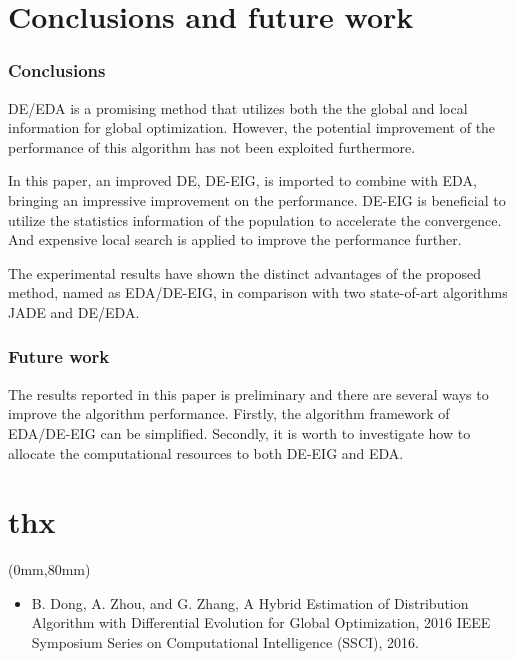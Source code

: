 \documentclass[xcolor=dvipsnames]{beamer}
\newenvironment{reference}[2]{%
  \begin{textblock*}{\textwidth}(#1,#2)
     \bgroup\fontsize{6pt}{\baselineskip}\selectfont\color[RGB]{0,112,192}}{\egroup\end{textblock*}}
\begin{document}
    \section{Conclusions and future work}
    \begin{frame}
    \frametitle{Conclusions}
    DE/EDA is a promising method that utilizes both the the global and local information for global optimization. However, the potential improvement of the performance of this algorithm has not been exploited furthermore.
    \par
     In this paper, an improved DE, DE-EIG, is imported to combine with EDA, bringing an impressive improvement on the performance. DE-EIG is beneficial to utilize the statistics information of the population to accelerate the convergence. And expensive local search is applied to improve the performance further. 
     
     The experimental results have shown the distinct advantages of the proposed method, named as EDA/DE-EIG, in comparison with two state-of-art algorithms JADE and DE/EDA.
    \end{frame}
    
    \begin{frame}
    \frametitle{Future work}
    The results reported in this paper is preliminary and there are several ways to improve the algorithm performance. Firstly, the algorithm framework of EDA/DE-EIG can be simplified. Secondly, it is worth to investigate how to allocate the computational resources to both DE-EIG and EDA.
    \end{frame}
    

    \section*{thx}
        \begin{frame}
        \begin{center}
        \fontsize{60pt}{\baselineskip}\selectfont {}
        \end{center}
        \begin{reference}{0mm}{80mm}
        \begin{itemize}
        \item  B. Dong, A. Zhou, and G. Zhang, A Hybrid Estimation of Distribution Algorithm with Differential Evolution for Global Optimization, 2016 IEEE Symposium Series on Computational Intelligence (SSCI), 2016.
        \end{itemize}
        \end{reference}
        \end{frame}
\end{document}
